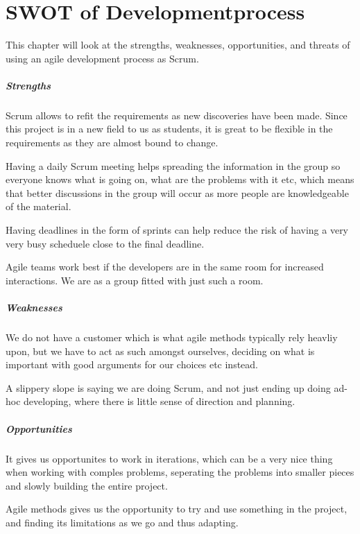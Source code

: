 \chapter{SWOT of Developmentprocess}
This chapter will look at the strengths, weaknesses, opportunities, and threats of using an agile development process as Scrum.
\paragraph{Strengths}
\begin{itemize*}
        \item Scrum allows to refit the requirements as new discoveries have been made. Since this project is in a new field to us as students, it is great to be flexible in the requirements as they are almost bound to change.
        \item Having a daily Scrum meeting helps spreading the information in the group so everyone knows what is going on, what are the problems with it etc, which means that better discussions in the group will occur as more people are knowledgeable of the material.
        \item Having deadlines in the form of sprints can help reduce the risk of having a very very busy scheduele close to the final deadline.
        \item Agile teams work best if the developers are in the same room for increased interactions. We are as a group fitted with just such a room.
\end{itemize*}
\paragraph{Weaknesses} 
\begin{itemize*}
        \item We do not have a customer which is what agile methods typically rely heavliy upon, but we have to act as such amongst ourselves, deciding on what is important with good arguments for our choices etc instead.
        \item A slippery slope is saying we are doing Scrum, and not just ending up doing ad-hoc developing, where there is little sense of direction and planning.
\end{itemize*}
\paragraph{Opportunities} 
\begin{itemize*}
        \item It gives us opportunites to work in iterations, which can be a very nice thing when working with comples problems, seperating the problems into smaller pieces and slowly building the entire project.
        \item Agile methods gives us the opportunity to try and use something in the project, and finding its limitations as we go and thus adapting.
\end{itemize*}
